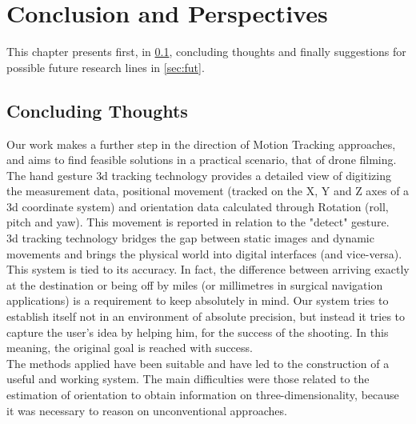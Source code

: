 \chapter*{Conclusion and Perspectives}
\label{chap:concl}
This chapter presents first, in \ref{sec:concl}, concluding thoughts and finally suggestions for possible future research lines in \ref{sec:fut}.

\section{Concluding Thoughts}
\label{sec:concl}

Our work makes a further step in the direction of Motion Tracking approaches, and aims to find feasible solutions in a practical scenario, that of drone filming. The hand gesture \gls{3d} tracking technology provides a detailed view of digitizing the measurement data, positional movement (tracked on the X, Y and Z axes of a \gls{3d} coordinate system) and orientation data calculated through Rotation (roll, pitch and yaw). This movement is reported in relation to the "detect" gesture. \\

\noindent \gls{3d} tracking technology bridges the gap between static images and dynamic movements and brings the physical world into digital interfaces (and vice-versa). This system is tied to its accuracy. In fact, the difference between arriving exactly at the destination or being off by miles (or millimetres in surgical navigation applications) is a requirement to keep absolutely in mind. Our system tries to establish itself not in an environment of absolute precision, but instead it tries to capture the user’s idea by helping him, for the success of the shooting. In this meaning, the original goal is reached with success. \\

\noindent The methods applied have been suitable and have led to the construction of a useful and working system. The main difficulties were those related to the estimation of orientation to obtain information on three-dimensionality, because it was necessary to reason on unconventional approaches. \\

